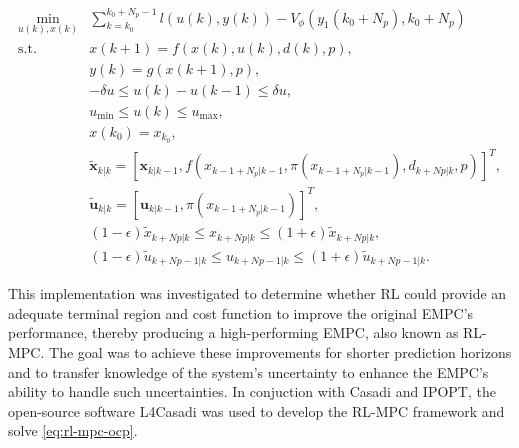 \begin{equation} \label{eq:rl-mpc-ocp}
	\begin{aligned}
		\min_{u(k),x(k)} & \sum_{k = k_0}^{k_0 + N_p-1} l(u(k), y(k)) - V_{\phi}(y_1(k_0+N_p), k_0+N_p) \\
		\text{s.t.} \quad & x(k+1) = f(x(k), u(k), d(k), p), \\
		& y(k) = g(x(k+1), p), \\
		& -\delta u \leq u(k) - u(k-1) \leq \delta u, \\
		& u_{\min} \leq u(k) \leq u_{\max}, \\
		& x(k_0) = x_{k_0}, \\
		& \tilde{\mathbf{x}}_{k|k} = [\mathbf{x}_{k|k-1}, f(x_{k-1 + N_p|k-1}, \pi(x_{k-1 + N_p|k-1}), d_{k+Np|k}, p)]^T, \\
		& \tilde{\mathbf{u}}_{k|k} = [\mathbf{u}_{k|k-1}, \pi(x_{k-1 + N_p|k-1})]^T, \\
		& (1-\epsilon)\tilde{x}_{k+Np|k} \leq x_{k+Np|k} \leq (1+\epsilon)\tilde{x}_{k+Np|k}, \\
		& (1-\epsilon)\tilde{u}_{k+Np-1|k} \leq u_{k+Np-1|k} \leq (1+\epsilon)\tilde{u}_{k+Np-1|k}.
	\end{aligned}
\end{equation}


This implementation was investigated to determine whether RL could provide an adequate terminal region and cost function to improve the original EMPC's performance, thereby producing a high-performing EMPC, also known as RL-MPC. The goal was to achieve these improvements for shorter prediction horizons and to transfer knowledge of the system's uncertainty to enhance the EMPC's ability to handle such uncertainties. In conjuction with Casadi and IPOPT, the open-source software L4Casadi \cite{salzmannLearningCasADiDatadriven2023,salzmannRealtimeNeuralMPCDeep2023} was used to develop the RL-MPC framework and solve \autoref{eq:rl-mpc-ocp}.
